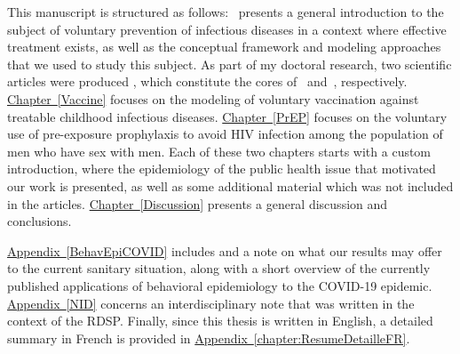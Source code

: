 This manuscript is structured as follows:~ presents a general introduction to the subject of voluntary prevention of infectious diseases in a context where effective treatment exists, as well as the conceptual framework and modeling approaches that we used to study this subject. As part of my doctoral research, two scientific articles were 
produced \cite[]{Jijon2017,Jijon2021}, which constitute the cores of~ and~, respectively. \hyperlink{Vaccine}{Chapter~\ref*{Vaccine}} focuses on the modeling of voluntary vaccination against treatable childhood infectious diseases. \hyperlink{PrEP}{Chapter~\ref*{PrEP}} focuses on the voluntary use of pre-exposure prophylaxis to avoid HIV infection among the population of men who have sex with men. Each of these two chapters starts with a custom introduction, where the epidemiology of the public health issue that motivated our work is presented, as well as some additional material which was not included in the articles. \hyperlink{Discussion}{Chapter~\ref*{Discussion}} presents a general discussion and conclusions. 

\hyperlink{BehavEpiCOVID}{Appendix~\ref*{BehavEpiCOVID}} includes and a note on what our results may offer to the current sanitary situation, along with a short overview of the currently published applications of behavioral epidemiology to the COVID-19 epidemic. 
\hyperlink{NID}{Appendix~\ref*{NID}} concerns an interdisciplinary note that was written in the context of the RDSP. Finally, since this thesis is written in English, a detailed summary in French is provided in \hyperlink{chapter:ResumeDetailleFR}{Appendix~\ref*{chapter:ResumeDetailleFR}}.